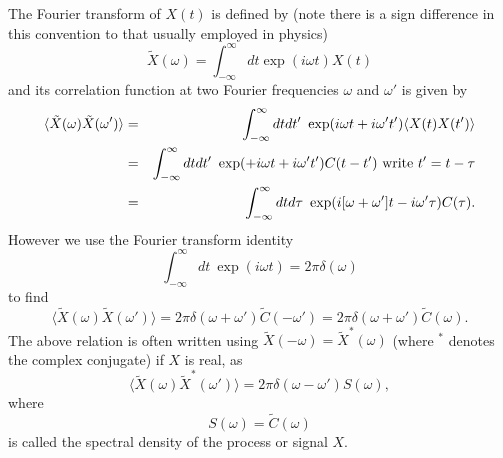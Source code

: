 \documentclass[11pt]{report}
\begin{document}
 The Fourier transform of $X(t)$ is defined by (note there is a sign difference in this convention to that usually employed in physics)
 \begin{equation}
 \tilde X(\omega) = \int_{-\infty}^{\infty} dt \exp(i\omega t) X(t)
 \end{equation}
 and its correlation function at two Fourier frequencies $\omega$ and $\omega'$ is given
 by
 \begin{eqnarray}
 \langle \tilde X(\omega)\tilde X(\omega')\rangle &=& \int_{-\infty}^{\infty} dt dt'\ 
 \exp(i\omega t +i\omega' t') \langle X(t)X(t')\rangle\nonumber \\
 &=&\int_{-\infty}^{\infty} dt dt'\ 
 \exp(+i\omega t +i\omega' t') C(t-t') \ {\rm write}\ t'=t-\tau \nonumber \\
 &=&\int_{-\infty}^{\infty} dt d\tau\ 
 \exp(i[\omega  +\omega' ]t -i\omega'\tau) C(\tau).
 \end{eqnarray}
 However we use the Fourier transform identity 
 \begin{equation}
 \int_{-\infty}^\infty dt\ \exp(i\omega t)= 2\pi \delta(\omega)
 \end{equation}
 to find
 \begin{equation}
 \langle \tilde X(\omega)\tilde X(\omega')\rangle = 2\pi \delta(\omega+\omega')\tilde C(-\omega') = 2\pi \delta(\omega+\omega')\tilde C(\omega).
 \end{equation}
 The above relation is often written using $\tilde X(-\omega)= \tilde X^*(\omega)$ (where $^*$ denotes the complex conjugate) if $X$ is real, as
 \begin{equation}\boxed{
 \langle \tilde X(\omega)\tilde X^*(\omega')\rangle  = 2\pi \delta(\omega- \omega')S(\omega),}
 \end{equation}
 where 
 \begin{equation}
 S(\omega) = \tilde C(\omega)
 \end{equation}
 is called the spectral density of the process or signal $X$. 
\end{document}
